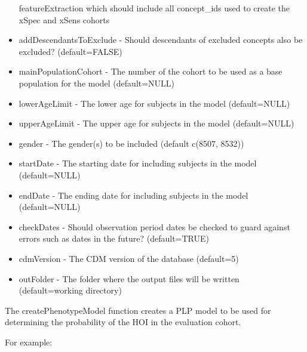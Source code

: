 \documentclass[
]{article}
\begin{document}
\begin{itemize}
  featureExtraction which should include all concept\_ids used to create
  the xSpec and xSens cohorts
\item
  addDescendantsToExclude - Should descendants of excluded concepts also
  be excluded? (default=FALSE)
\item
  mainPopulationCohort - The number of the cohort to be used as a base
  population for the model (default=NULL)
\item
  lowerAgeLimit - The lower age for subjects in the model (default=NULL)
\item
  upperAgeLimit - The upper age for subjects in the model (default=NULL)
\item
  gender - The gender(s) to be included (default c(8507, 8532))
\item
  startDate - The starting date for including subjects in the model
  (default=NULL)
\item
  endDate - The ending date for including subjects in the model
  (default=NULL)
\item
  checkDates - Should observation period dates be checked to guard
  against errors such as dates in the future? (default=TRUE)
\item
  cdmVersion - The CDM version of the database (default=5)
\item
  outFolder - The folder where the output files will be written
  (default=working directory)
\end{itemize}

The createPhenotypeModel function creates a PLP model to be used for
determining the probability of the HOI in the evaluation cohort.

For example:
\end{document}
